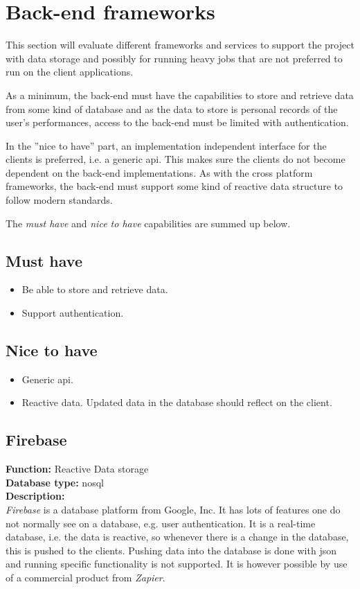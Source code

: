 \section{Back-end frameworks}
This section will evaluate different frameworks and services to support the project with data storage and possibly for running heavy jobs that are not preferred to run on the client applications.

As a minimum, the back-end must have the capabilities to store and retrieve data from some kind of database and as the data to store is personal records of the user's performances, access to the back-end must be limited with authentication.

In the ''nice to have'' part, an implementation independent interface for the clients is preferred, i.e. a generic \gls{api}.
This makes sure the clients do not become dependent on the back-end implementations.
As with the cross platform frameworks, the back-end must support some kind of reactive data structure to follow modern standards.

The \textit{must have} and \textit{nice to have} capabilities are summed up below.
	
\subsection*{Must have}
\begin{itemize}
	\item Be able to store and retrieve data.
	\item Support authentication.
\end{itemize}
	
\subsection*{Nice to have}	
\begin{itemize}
	\item Generic \gls{api}.
	\item Reactive data. Updated data in the database should reflect on the client.
\end{itemize}

\subsection*{Firebase}
\textbf{Function:} Reactive Data storage
\\
\textbf{Database type:} \gls{nosql}
\\
\textbf{Description:}
\\
\textit{Firebase} is a database platform from Google, Inc. 
It has lots of features one do not normally see on a database, e.g. user authentication.
It is a real-time database, i.e. the data is reactive, so whenever there is a change in the database, this is pushed to the clients. 
Pushing data into the database is done with \gls{json} and running specific functionality is not supported.
It is however possible by use of a commercial product from  \textit{Zapier}.


